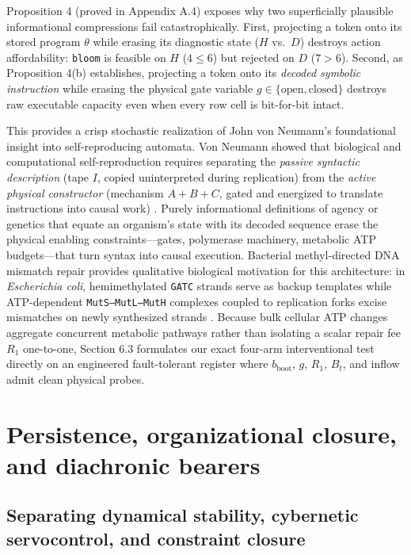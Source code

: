 \documentclass[11pt,a4paper]{article}
\begin{document}
Proposition 4 (proved in Appendix A.4) exposes why two superficially
plausible informational compressions fail catastrophically. First,
projecting a token onto its stored program \(\theta\) while erasing its
diagnostic state (\(H\) vs.~\(D\)) destroys action affordability:
\texttt{bloom} is feasible on \(H\) (\(4 \le 6\)) but rejected on \(D\)
(\(7 > 6\)). Second, as Proposition 4(b) establishes, projecting a token
onto its \emph{decoded symbolic instruction} while erasing the physical
gate variable \(g \in \{\mathrm{open}, \mathrm{closed}\}\) destroys raw
executable capacity even when every row cell is bit-for-bit intact.

This provides a crisp stochastic realization of John von Neumann's
\citeyearpar{vonNeumann1966} foundational insight into self-reproducing
automata. Von Neumann showed that biological and computational
self-reproduction requires separating the \emph{passive syntactic
description} (tape \(I\), copied uninterpreted during replication) from
the \emph{active physical constructor} (mechanism \(A+B+C\), gated and
energized to translate instructions into causal work)
\citep{rosen1991, deacon2011}. Purely informational definitions of
agency or genetics that equate an organism's state with its decoded
sequence erase the physical enabling constraints---gates, polymerase
machinery, metabolic ATP budgets---that turn syntax into causal
execution. Bacterial methyl-directed DNA mismatch repair provides
qualitative biological motivation for this architecture: in
\emph{Escherichia coli}, hemimethylated \texttt{GATC} strands serve as
backup templates while ATP-dependent \texttt{MutS–MutL–MutH} complexes
coupled to replication forks excise mismatches on newly synthesized
strands \citep{auWelshModrich1992, hasanLeach2015}. Because bulk
cellular ATP changes aggregate concurrent metabolic pathways rather than
isolating a scalar repair fee \(R_1\) one-to-one, Section 6.3 formulates
our exact four-arm interventional test directly on an engineered
fault-tolerant register where \(b_{\mathrm{boot}}\), \(g\), \(R_1\),
\(B_t\), and inflow admit clean physical probes.

\section{Persistence, organizational closure, and diachronic
bearers}\label{persistence-organizational-closure-and-diachronic-bearers}

\subsection{Separating dynamical stability, cybernetic servocontrol, and
constraint
closure}\label{separating-dynamical-stability-cybernetic-servocontrol-and-constraint-closure}
\end{document}
